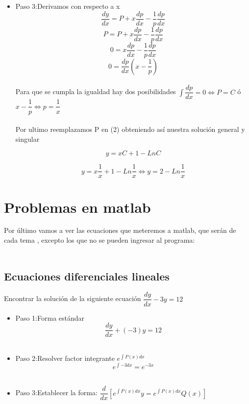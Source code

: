 \documentclass[10pt,a4paper]{article}
\begin{document}
{{{{{{{{{{{{\begin{itemize}
 \begin{equation}\tag{2}
y=xp+1-Ln P
\end{equation}
 \item Paso 3:Derivamos con respecto a x\\
 $$\dfrac{dy}{dx}=P+x\dfrac{dp}{dx}-\dfrac{1}{p}\dfrac{dp}{dx}$$
 $$P=P+x\dfrac{dp}{dx}-\dfrac{1}{p}\dfrac{dp}{dx}$$
 $$0=x\dfrac{dp}{dx}-\dfrac{1}{p}\dfrac{dp}{dx}$$
 $$0=\dfrac{dp}{dx}(x-\dfrac{1}{p})$$\\
 Para que se cumpla la igualdad hay dos posibilidades
 $\int \dfrac{dp}{dx}=0 \Leftrightarrow P=C$  ó $  x-\dfrac{1}{p}\Leftrightarrow p=\dfrac{1}{x}$\\\, \\
 Por ultimo reemplazamos P en (2) obteniendo así nuestra solución general y singular
 
  \begin{equation}\tag{solución general}
y=xC+1-Ln C
\end{equation}

 \begin{equation}\tag{solución particular}
y=x\dfrac{1}{x}+1-Ln \dfrac{1}{x}\Leftrightarrow y=2-Ln \dfrac{1}{x}
\end{equation}
 
 
 \end{itemize}
  
\section{Problemas en matlab}

Por último vamos a ver las ecuaciones que meteremos a matlab, que serán de cada tema , excepto los que no se pueden ingresar al programa:\\\,\\
\subsection{Ecuaciones diferenciales lineales}
Encontrar  la solución de la siguiente ecuación $\dfrac{dy}{dx}-3y=12$
\begin{itemize}
\item Paso 1:Forma estándar
\begin{equation}\tag{donde $P(x)=-3$ y $Q(x)=12$ }
\dfrac{dy}{dx}+(-3)y=12
\end{equation}
\,\\
\item Paso 2:Resolver factor integrante $e ^{\int P(x)dx}$
\begin{equation*}
e ^{\int -3dx}=e^{-3x}
\end{equation*}
\,\\
\item Paso 3:Establecer la forma: $\dfrac{d}{dx}[e ^{\int P(x)dx}y=e ^{\int P(x)dx}Q(x)]$


\end{itemize}}}}}}}}}}}}}
\end{document}
